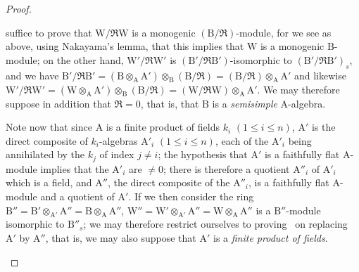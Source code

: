 \begin{proof}
\begin{env}[2.5.8.8]
suffice to prove that $\mathrm{W}/\mathfrak{R}\mathrm{W}$ is a monogenic
$(\mathrm{B}/\mathfrak{R})$-module, for we see as above, using Nakayama's
lemma, that this implies that $\mathrm{W}$ is a monogenic
$\mathrm{B}$-module; on the other hand,
$\mathrm{W}'/\mathfrak{R}\mathrm{W}'$ is
$(\mathrm{B}'/\mathfrak{R}\mathrm{B}')$-isomorphic to
$(\mathrm{B}'/\mathfrak{R}\mathrm{B}')_s$, and we have
$\mathrm{B}'/\mathfrak{R}\mathrm{B}'=(\mathrm{B}\otimes_{\mathrm{A}}\mathrm{A}')\otimes_{\mathrm{B}}(\mathrm{B}/\mathfrak{R})=(\mathrm{B}/\mathfrak{R})\otimes_{\mathrm{A}}\mathrm{A}'$
and likewise
$\mathrm{W}'/\mathfrak{R}\mathrm{W}'=(\mathrm{W}\otimes_{\mathrm{A}}\mathrm{A}')\otimes_{\mathrm{B}}(\mathrm{B}/\mathfrak{R})=(\mathrm{W}/\mathfrak{R}\mathrm{W})\otimes_{\mathrm{A}}\mathrm{A}'$.
We may therefore suppose in addition that $\mathfrak{R}=0$, that is, that
$\mathrm{B}$ is a \emph{semisimple} $\mathrm{A}$-algebra.

Note now that since $\mathrm{A}$ is a finite product of fields $k_i$
$(1\leq i\leq n)$, $\mathrm{A}'$ is the direct composite of $k_i$-algebras
$\mathrm{A}'_i$ $(1\leq i\leq n)$, each of the $\mathrm{A}'_i$ being
annihilated by the $k_j$ of index $j\neq i$; the hypothesis that
$\mathrm{A}'$ is a faithfully flat $\mathrm{A}$-module implies that the
$\mathrm{A}'_i$ are $\neq0$; there is therefore a quotient
$\mathrm{A}''_i$ of $\mathrm{A}'_i$ which is a field, and $\mathrm{A}''$,
the direct composite of the $\mathrm{A}''_i$, is a faithfully flat
$\mathrm{A}$-module and a quotient of $\mathrm{A}'$. If we then consider
the ring
$\mathrm{B}''=\mathrm{B}'\otimes_{\mathrm{A}'}\mathrm{A}''=\mathrm{B}\otimes_{\mathrm{A}}\mathrm{A}''$,
$\mathrm{W}''=\mathrm{W}'\otimes_{\mathrm{A}'}\mathrm{A}''=\mathrm{W}\otimes_{\mathrm{A}}\mathrm{A}''$
is a $\mathrm{B}''$-module isomorphic to $\mathrm{B}''_s$; we may
therefore restrict ourselves to proving~ on replacing
$\mathrm{A}'$ by $\mathrm{A}''$, that is, we may also suppose that
$\mathrm{A}'$ is a \emph{finite product of fields}.


\end{env}
\end{proof}
